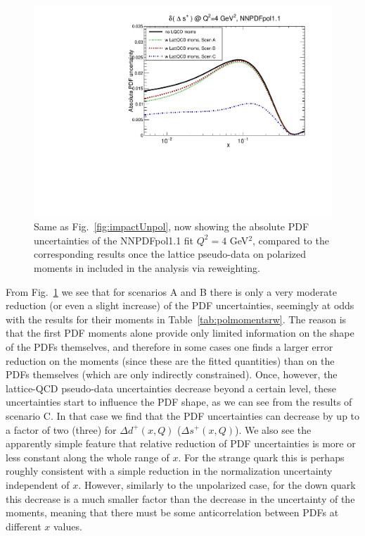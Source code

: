 \begin{figure}[!t]
\includegraphics[scale=0.45]{plots/xsp-pol-lattice-relerr.pdf}
\caption{\small Same as Fig.~\ref{fig:impactUnpol}, now
  showing the absolute PDF uncertainties of the NNPDFpol1.1 fit
  $Q^2=4$ GeV$^2$, compared to the corresponding results once the lattice 
  pseudo-data on polarized moments in included in the analysis via reweighting.
}    
\label{fig:impactPol}
\end{figure}

From Fig.~\ref{fig:impactPol} we see that for scenarios
A and B there is only a very moderate reduction (or even a slight increase)
of the PDF uncertainties, seemingly at odds with the results
for their moments in Table~\ref{tab:polmomentsrw}.
%
The reason is that the first PDF moments alone provide only limited
information on the shape of the PDFs themselves, and therefore in some
cases one finds a larger error reduction on the moments (since these
are the fitted quantities) than on the PDFs themselves (which are
only indirectly constrained).
%
Once, however, the lattice-QCD pseudo-data uncertainties
decrease beyond a certain level, these uncertainties start to influence the 
PDF shape, as we can see from the results of scenario C.
%
In that case we find that the PDF uncertainties can decrease by up to a factor
of two (three) for $\Delta d^+(x,Q)$ ($\Delta s^+(x,Q)$).
%
We also see the apparently simple feature that relative reduction of PDF 
uncertainties is more or less constant along the whole range of $x$. 
%
For the strange quark this is perhaps roughly consistent with a simple 
reduction in the normalization uncertainty independent of $x$.
%
However, similarly to the unpolarized case, for the down quark this 
decrease is a much smaller factor than the decrease in the uncertainty 
of the moments, meaning that there must be some anticorrelation between 
PDFs at different $x$ values.  


